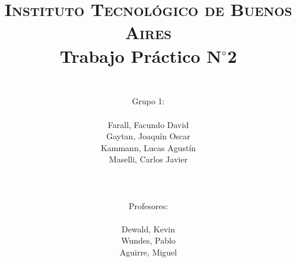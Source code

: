 




	\title{
		\normalfont \normalsize \textsc{Instituto Tecnol\'ogico de Buenos Aires} \\ [25pt]
		\huge Trabajo Pr\'actico N$^{\circ}$2 \\
		\author{
			\\Grupo 1:\\\\Farall, Facundo David\\Gaytan, Joaqu\'in Oscar\\Kammann, Lucas Agust\'in\\Maselli, Carlos Javier\\ \\ \\ \\
			Profesores: \\\\ Dewald, Kevin\\Wundes, Pablo\\Aguirre, Miguel \\ \\ 
		}
	}
	\maketitle
	\newpage

	\tableofcontents

	\newpage
	
	\newpage
	
	\newpage
	
	\newpage
	
	\newpage
	
	\newpage
	
	\newpage
	


